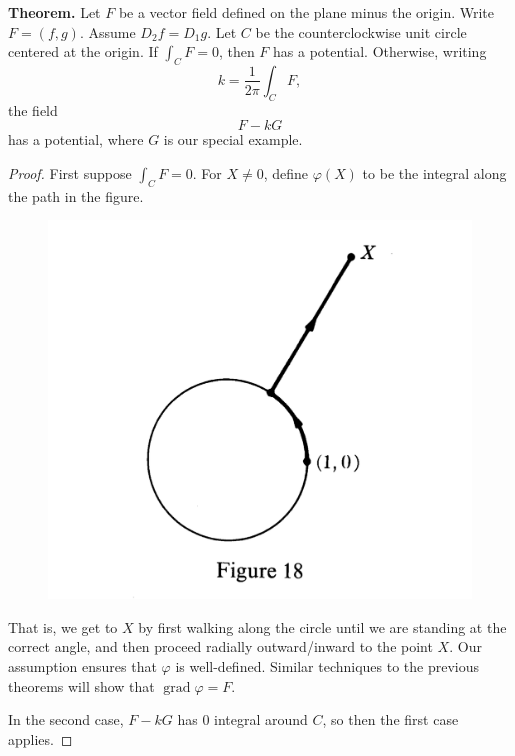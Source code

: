 \documentclass{article}
\DeclareMathOperator{\grd}{grad}
\begin{document}
\textbf{Theorem.} Let $F$ be a vector field defined on the plane minus the origin.
Write $F = (f,g)$. Assume $D_2 f = D_1 g$. Let $C$ be the counterclockwise unit circle
centered at the origin. If $\int_C F = 0$, then $F$ has a potential. Otherwise,
writing \[k = \frac{1}{2\pi} \int_C F,\]
the field \[F - kG\] has a potential, where $G$ is our special example.
\begin{proof}
    First suppose $\int_C F = 0$. For $X \neq 0$, define $\varphi(X)$ to be 
    the integral along the path in the figure.
    \begin{figure}[h]
        \centering
        \includegraphics[scale = 0.15]{contour.jpeg}
    \end{figure}
    That is, we get to $X$ by first walking along the circle until we 
    are standing at the correct angle, and then proceed radially outward/inward to the point $X$.
    Our assumption ensures that $\varphi$ is well-defined. Similar techniques to the previous
    theorems will show that $\grd \varphi = F$.

    In the second case, $F-kG$ has $0$ integral around $C$, so then the first
    case applies.
\end{proof}
\end{document}
